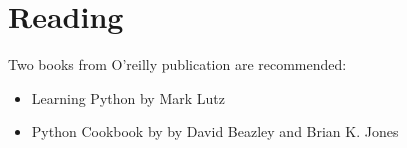 \section{Reading}
Two books from O'reilly publication are recommended:
\begin{itemize}
\item Learning Python by Mark Lutz
\item Python Cookbook by by David Beazley and Brian K. Jones
\end{itemize}
